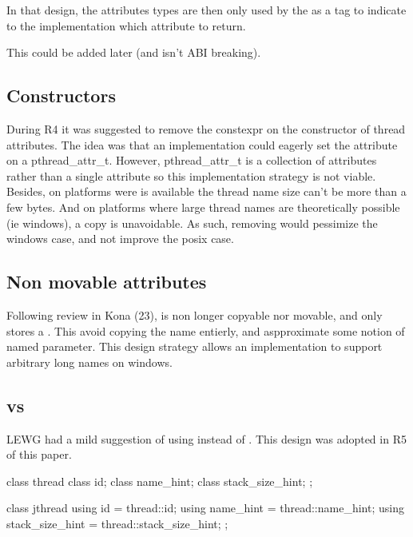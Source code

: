 \documentclass{wg21}
\begin{document}
In that design, the attributes types are then only used by the  as a tag to indicate to the implementation which attribute to return.

This could be added later (and isn't ABI breaking).


\subsection{ Constructors}

During R4 it was suggested to remove the constexpr on the constructor of thread attributes.
The idea was that an implementation could eagerly set the attribute on a pthread_attr_t.
However, pthread_attr_t is a collection of attributes rather than a single attribute so this
implementation strategy is not viable. Besides, on platforms were  is
available the thread name size can't be more than a few bytes.
And on platforms where large thread names are theoretically possible (ie windows), a copy is
unavoidable. As such, removing  would pessimize the windows case, and not
improve the posix case.

\subsection{Non movable attributes}

Following review in Kona (23),  is non longer copyable nor movable, and only stores a .
This avoid copying the name entierly, and aspproximate some notion of named parameter.
This design strategy allows an implementation to support arbitrary long names on windows.

\subsection{ vs }

LEWG had a mild suggestion of using  instead of .
This design was adopted in R5 of this paper.

\begin{colorblock}
class thread {
	class id;
	class name_hint;
	class stack_size_hint;
};

class jthread {
	using id = thread::id;
	using name_hint = thread::name_hint;
	using stack_size_hint = thread::stack_size_hint;
};
\end{colorblock}
\end{document}
